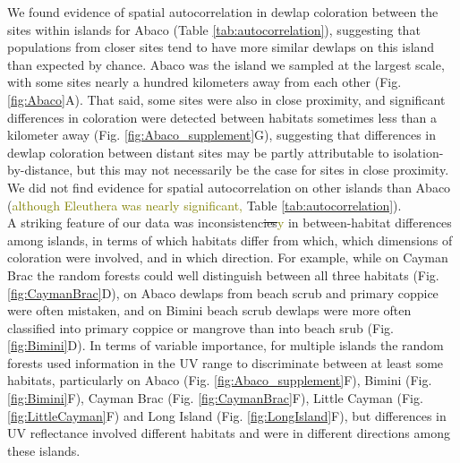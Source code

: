 We found evidence of spatial autocorrelation in dewlap coloration between the sites within islands for Abaco (Table \ref{tab:autocorrelation}), suggesting that populations from closer sites tend to have more similar dewlaps on this island than expected by chance. Abaco was the island we sampled at the largest scale, with some sites nearly a hundred kilometers away from each other (Fig. \ref{fig:Abaco}A). That said, some sites were also in close proximity, and significant differences in coloration were detected between habitats sometimes less than a kilometer away (Fig. \ref{fig:Abaco_supplement}G), suggesting that differences in dewlap coloration between distant sites may be partly attributable to isolation-by-distance, but this may not necessarily be the case for sites in close proximity. We did not find evidence for spatial autocorrelation on other islands than Abaco (\textcolor{olive}{although Eleuthera was nearly significant, }Table \ref{tab:autocorrelation}).\\

A striking feature of our data was inconsistenc\sout{ies}\textcolor{olive}{y} in between-habitat differences among islands, in terms of which habitats differ from which, which dimensions of coloration were involved, and in which direction. For example, while on Cayman Brac the random forests could well distinguish between all three habitats (Fig. \ref{fig:CaymanBrac}D), on Abaco dewlaps from beach scrub and primary coppice were often mistaken, and on Bimini beach scrub dewlaps were more often classified into primary coppice or mangrove than into beach srub (Fig. \ref{fig:Bimini}D). In terms of variable importance, for multiple islands the random forests used information in the UV range to discriminate between at least some habitats, particularly on Abaco (Fig. \ref{fig:Abaco_supplement}F), Bimini (Fig. \ref{fig:Bimini}F), Cayman Brac (Fig. \ref{fig:CaymanBrac}F), Little Cayman (Fig. \ref{fig:LittleCayman}F) and Long Island (Fig. \ref{fig:LongIsland}F), but differences in UV reflectance involved different habitats and were in different directions among these islands.\\